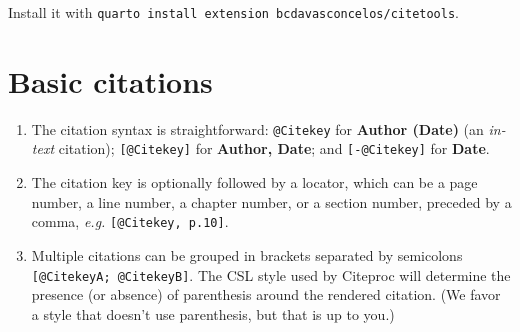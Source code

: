 \documentclass[
  10pt,
  oneside,
  cleardoublepage=empty,
  numbers=noenddot,
  titlepage,
  toclink=all,
  toc=bibliography,
  headinclude,
  footinclude]{scrbook}
\theoremstyle{plain}
\theoremstyle{plain}
\theoremstyle{definition}
\theoremstyle{definition}
\theoremstyle{plain}
\theoremstyle{plain}
\theoremstyle{definition}
\theoremstyle{plain}
\theoremstyle{remark}
\begin{document}
\begin{tcolorbox}[enhanced jigsaw, bottomrule=.15mm, bottomtitle=1mm, rightrule=.15mm, opacityback=0, coltitle=black, colback=white, left=2mm, arc=.35mm, colbacktitle=quarto-callout-tip-color!10!white, breakable, toptitle=1mm, colframe=quarto-callout-tip-color-frame, toprule=.15mm, titlerule=0mm, title=\textcolor{quarto-callout-tip-color}{\faLightbulb}\hspace{0.5em}{Using \textbf{Cite Tools }in other projects}, leftrule=.75mm, opacitybacktitle=0.6]

Install it with
\texttt{quarto\ install\ extension\ bcdavasconcelos/citetools}.

\end{tcolorbox}

\section{Basic citations}\label{basic-citations}

\begin{enumerate}
\def\labelenumi{\arabic{enumi}.}
\item
  The citation syntax is straightforward: \texttt{@Citekey} for
  \textbf{Author (Date)} (an \emph{in-text} citation);
  \texttt{{[}@Citekey{]}} for \textbf{Author, Date}; and
  \texttt{{[}-@Citekey{]}} for \textbf{Date}.
\item
  The citation key is optionally followed by a locator, which can be a
  page number, a line number, a chapter number, or a section number,
  preceded by a comma, \emph{e.g.} \texttt{{[}@Citekey,\ p.10{]}}.
\item
  Multiple citations can be grouped in brackets separated by semicolons
  \texttt{{[}@CitekeyA;\ @CitekeyB{]}}. The CSL style used by Citeproc
  will determine the presence (or absence) of parenthesis around the
  rendered citation. (We favor a style that doesn't use parenthesis, but
  that is up to you.)
\end{enumerate}
\end{document}
